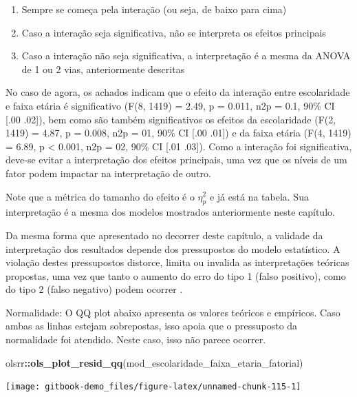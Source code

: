\documentclass[
]{book}
\newenvironment{Shaded}{\begin{snugshade}}{\end{snugshade}}
\newcommand{\KeywordTok}[1]{\textcolor[rgb]{0.13,0.29,0.53}{\textbf{#1}}}
\newcommand{\NormalTok}[1]{#1}
\newcommand{\OperatorTok}[1]{\textcolor[rgb]{0.81,0.36,0.00}{\textbf{#1}}}
\providecommand{\tightlist}{%
  \setlength{\itemsep}{0pt}\setlength{\parskip}{0pt}}
\begin{document}
\begin{enumerate}
\def\labelenumi{\arabic{enumi}.}
\tightlist
\item
  Sempre se começa pela interação (ou seja, de baixo para cima)\\
\item
  Caso a interação seja significativa, não se interpreta os efeitos principais\\
\item
  Caso a interação não seja significativa, a interpretação é a mesma da ANOVA de 1 ou 2 vias, anteriormente descritas
\end{enumerate}

No caso de agora, os achados indicam que o efeito da interação entre escolaridade e faixa etária é significativo (F(8, 1419) = 2.49, p = 0.011, n2p = 0.1, 90\% CI {[}.00 .02{]}), bem como são também significativos os efeitos da escolaridade (F(2, 1419) = 4.87, p = 0.008, n2p = 01, 90\% CI {[}.00 .01{]}) e da faixa etária (F(4, 1419) = 6.89, p \textless{} 0.001, n2p = 02, 90\% CI {[}.01 .03{]}). Como a interação foi significativa, deve-se evitar a interpretação dos efeitos principais, uma vez que os níveis de um fator podem impactar na interpretação de outro.

Note que a métrica do tamanho do efeito é o \(\eta_p^2\) e já está na tabela. Sua interpretação é a mesma dos modelos mostrados anteriormente neste capítulo.

Da mesma forma que apresentado no decorrer deste capítulo, a validade da interpretação dos resultados depende dos pressupostos do modelo estatístico. A violação destes pressupostos distorce, limita ou invalida as interpretações teóricas propostas, uma vez que tanto o aumento do erro do tipo 1 (falso positivo), como do tipo 2 (falso negativo) podem ocorrer \citep{Lix1996, Barker2015, Ernst2017}.

Normalidade: O QQ plot abaixo apresenta os valores teóricos e empíricos. Caso ambas as linhas estejam sobrepostas, isso apoia que o pressuposto da normalidade foi atendido. Neste caso, isso não parece ocorrer.

\begin{Shaded}
\begin{Highlighting}[]
\NormalTok{olsrr}\OperatorTok{::}\KeywordTok{ols_plot_resid_qq}\NormalTok{(mod_escolaridade_faixa_etaria_fatorial)}
\end{Highlighting}
\end{Shaded}

\begin{center}\texttt{[image: gitbook-demo\_files/figure-latex/unnamed-chunk-115-1]} \end{center}
\end{document}
